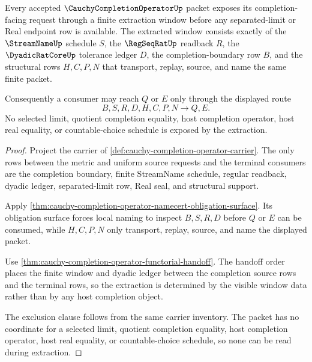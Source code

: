 \begin{theorem}
\label{thm:cauchy-completion-operator-window-extraction}
Every accepted $\CauchyCompletionOperatorUp$ packet exposes its completion-facing request through a finite extraction window before any separated-limit or Real endpoint row is available. The extracted window consists exactly of the $\StreamNameUp$ schedule $S$, the $\RegSeqRatUp$ readback $R$, the $\DyadicRatCoreUp$ tolerance ledger $D$, the completion-boundary row $B$, and the structural rows $H,C,P,N$ that transport, replay, source, and name the same finite packet.

Consequently a consumer may reach $Q$ or $E$ only through the displayed route
$$
B,S,R,D,H,C,P,N \longrightarrow Q,E .
$$
No selected limit, quotient completion equality, host completion operator, host real equality, or countable-choice schedule is exposed by the extraction.
\end{theorem}
\begin{proof}
Project the carrier of \autoref{def:cauchy-completion-operator-carrier}. The only rows between the metric and uniform source requests and the terminal consumers are the completion boundary, finite StreamName schedule, regular readback, dyadic ledger, separated-limit row, Real seal, and structural support.

Apply \autoref{thm:cauchy-completion-operator-namecert-obligation-surface}. Its obligation surface forces local naming to inspect $B,S,R,D$ before $Q$ or $E$ can be consumed, while $H,C,P,N$ only transport, replay, source, and name the displayed packet.

Use \autoref{thm:cauchy-completion-operator-functorial-handoff}. The handoff order places the finite window and dyadic ledger between the completion source rows and the terminal rows, so the extraction is determined by the visible window data rather than by any host completion object.

The exclusion clause follows from the same carrier inventory. The packet has no coordinate for a selected limit, quotient completion equality, host completion operator, host real equality, or countable-choice schedule, so none can be read during extraction.
\end{proof}

